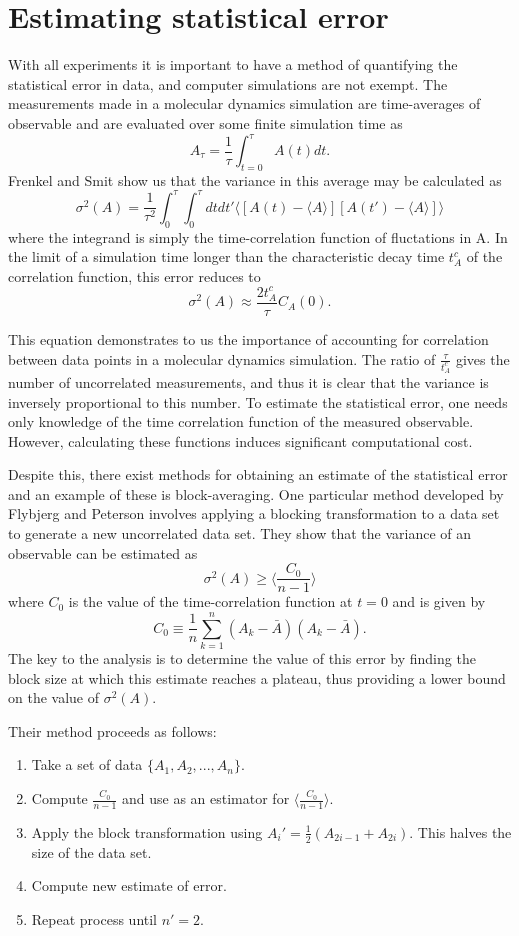 \section{Estimating statistical error}
With all experiments it is important to have a method of quantifying the statistical error in data, and computer simulations are not exempt.
The measurements made in a molecular dynamics simulation are time-averages of observable and are evaluated over some finite simulation time as
$$A_{\tau} = \frac{1}{\tau} \int_{t=0}^{\tau} A(t) dt.$$
Frenkel and Smit show us that the variance in this average may be calculated as 
$$\sigma^{2}(A) = \frac{1}{\tau^{2}} \int_{0}^{\tau} \int_{0}^{\tau} dt dt' \big \langle [ A(t) - \langle A \rangle ] [A(t') - \langle A \rangle] \big \rangle$$
where the integrand is simply the time-correlation function of fluctations in A\cite{FrenkelSmit}.
In the limit of a simulation time longer than the characteristic decay time $t_{A}^c$ of the correlation function, this error reduces to 
$$\sigma^{2}(A) \approx \frac{2t^{c}_{A}}{\tau}C_{A}(0).$$

This equation demonstrates to us the importance of accounting for correlation between data points in a molecular dynamics simulation. 
The ratio of $\frac{\tau}{t_{A}^{c}}$ gives the number of uncorrelated measurements, and thus it is clear that the variance is inversely proportional to this number.
To estimate the statistical error, one needs only knowledge of the time correlation function of the measured observable.
However, calculating these functions induces significant computational cost.

Despite this, there exist methods for obtaining an estimate of the statistical error and an example of these is block-averaging.
One particular method developed by Flybjerg and Peterson involves applying a blocking transformation to a data set to generate a new uncorrelated data set\cite{Flyvbjerg1989}.
They show that the variance of an observable can be estimated as
$$\sigma^{2}(A) \geq \bigg \langle \frac{C_{0}}{n-1} \bigg \rangle$$
where $C_{0}$ is the value of the time-correlation function at $t=0$ and is given by
$$C_{0} \equiv \frac{1}{n} \sum_{k=1}^{n}(A_{k} - \bar{A})(A_{k} - \bar{A}).$$
The key to the analysis is to determine the value of this error by finding the block size at which this estimate reaches a plateau, thus providing a lower bound on the value of $\sigma^{2}(A)$. 

Their method proceeds as follows:
\begin{enumerate}
 \item Take a set of data $\{A_{1},A_{2},...,A_{n}\}$.
 \item Compute $\frac{C_{0}}{n-1}$ and use as an estimator for $\big \langle \frac{C_{0}}{n-1} \big \rangle$.
 \item Apply the block transformation using
	$A_{i}' = \frac{1}{2} (A_{2i-1} + A_{2i}).$
	This halves the size of the data set.
 \item Compute new estimate of error.
 \item Repeat process until $n' = 2$.
\end{enumerate}

